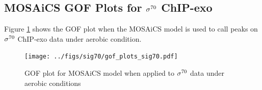 \documentclass[11pt]{article}\usepackage[]{graphicx}\usepackage[]{color}
\begin{document}
\subsection*{MOSAiCS GOF Plots for $\sigma^{70}$ ChIP-exo}

Figure \ref{fig:mosaics_exo} shows the GOF plot when the MOSAiCS model
is used to call peaks on $\sigma^{70}$ ChIP-exo data under aerobic condition.

\begin{figure}[H]
  \centering
  \texttt{[image: ../figs/sig70/gof\_plots\_sig70.pdf]}
  \caption{GOF plot for MOSAiCS model when applied to $\sigma^{70}$ data under aerobic conditions}
  \label{fig:mosaics_exo}
\end{figure}
\end{document}
